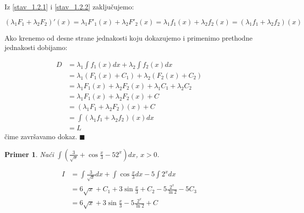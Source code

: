 \documentclass{article}
\newtheorem{prim}{Primer}[section]
\begin{document}
Iz \eqref{stav_1.2.1} i \eqref{stav_1.2.2} zaključujemo:

\begin{equation} \label{stav_1.2.3}
    (\lambda_1 F_1 + \lambda_2 F_2)'(x) =
    \lambda_1 F'_1(x) + \lambda_2 F'_2(x) =
    \lambda_1 f_1(x) + \lambda_2 f_2(x) =
    (\lambda_1 f_1 + \lambda_2 f_2)(x)
\end{equation}

Ako krenemo od desne strane jednakosti koju dokazujemo i
primenimo prethodne jednakosti dobijamo:

\begin{align*}
    D & = \lambda_1\int f_1(x) dx + \lambda_2\int f_2(x) dx \\ &=
    \lambda_1(F_1(x) + C_1) + \lambda_2(F_2(x) + C_2)       \\ &=
    \lambda_1  F_1(x) + \lambda_2  F_2(x) +
    \lambda_1  C_1 + \lambda_2  C_2                         \\ &=
    \lambda_1  F_1(x) + \lambda_2  F_2(x) + C               \\ &=
    (\lambda_1 F_1 + \lambda_2 F_2)(x) + C                  \\ &=
    \int (\lambda_1 f_1+ \lambda_2 f_2)(x)dx                \\ &=
    L
\end{align*}
čime završavamo dokaz.
\null\hfill $\blacksquare$ \par
\begin{primbox}
    \begin{prim}
        Naći $\int (\frac{3}{\sqrt{x}} +
            \cos\frac{x}{3} - 52^x)dx$, $x > 0$.
    \end{prim}
    \begin{align*}
        I & = \int\frac{3}{\sqrt{x}} dx + \int \cos\frac{x}{3} dx - 5\int 2^x dx
        \\ & = 6\sqrt{x} + C_1 + 3\sin\frac{x}{3} + C_2 - 5\frac{2^x}{\ln{2}} - 5C_3
        \\ & = 6\sqrt{x} + 3\sin\frac{x}{3} - 5\frac{2^x}{\ln{2}} + C
    \end{align*}
\end{primbox}
\end{document}
